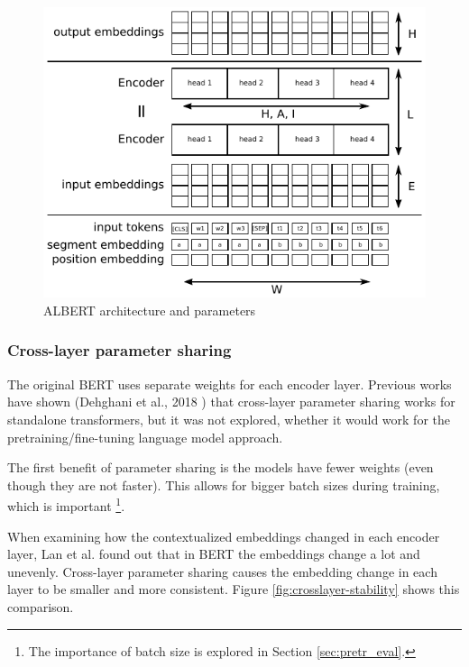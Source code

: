 \documentclass[
  printed, %
  color,   %
  table,   %
  oneside, %
  lof,     %
  lot,     %
]{fithesis3}
\begin{document}
\begin{figure}[hbt]
  \begin{center}
    \includegraphics[width=0.9\linewidth]{img/albert.pdf}
  \end{center}
  \vspace{-0.5cm}
  \caption{ALBERT architecture and parameters}
  \label{fig:albert}
\end{figure}

\subsubsection{Cross-layer parameter sharing}
The original BERT uses separate weights for each encoder layer. Previous works have shown (Dehghani et al., 2018 \parencite{uni-trans}) that cross-layer parameter sharing works for standalone transformers, but it was not explored, whether it would work for the pretraining/fine-tuning language model approach. 

The first benefit of parameter sharing is the models have fewer weights (even though they are not faster). This allows for bigger batch sizes during training, which is important \footnote{The importance of batch size is explored in Section \ref{sec:pretr_eval}.}.

When examining how the contextualized embeddings changed in each encoder layer, Lan et al. found out that in BERT the embeddings change a lot and unevenly. Cross-layer parameter sharing causes the embedding change in each layer to be smaller and more consistent. Figure \ref{fig:crosslayer-stability} shows this comparison.  
\end{document}
